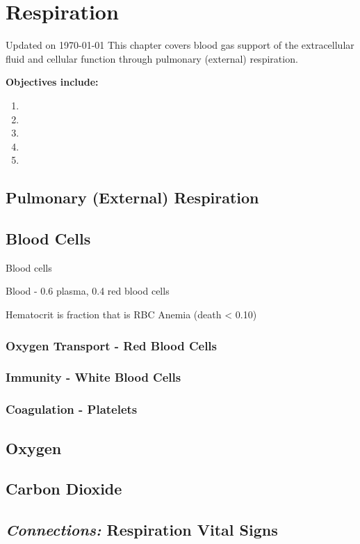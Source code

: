 \chapter{Respiration}\label{chp:blood_oxygen}
Updated on \today
\minitoc
This chapter covers blood gas support of the extracellular fluid and cellular function through pulmonary (external) respiration.

\vspace{5mm}

\textbf{Objectives include:}
\begin{enumerate}
    \item
    \item
    \item
    \item
    \item
\end{enumerate}

\section{Pulmonary (External) Respiration}

\section{Blood Cells}

Blood cells

Blood - 0.6 plasma, 0.4 red blood cells 

Hematocrit is fraction that is RBC
Anemia (death < 0.10)

\subsection{Oxygen Transport - Red Blood Cells}

\subsection{Immunity - White Blood Cells}

\subsection{Coagulation - Platelets}

\section{Oxygen}



\section{Carbon Dioxide}

\section{\textit{Connections:} Respiration Vital Signs}

\printbibliography[heading=subbibintoc]